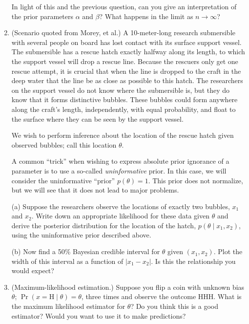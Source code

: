 \documentclass{article}
\newcommand{\given}{\mid}
\begin{document}
\begin{enumerate}
  In light of this and the previous question, can you give an
  interpretation of the prior parameters $\alpha$ and $\beta$?
  What happens in the limit as $n \to \infty$?

\item
  (Scenario quoted from Morey, et al.)  A 10-meter-long research
  submersible with several people on board has lost contact with its
  surface support vessel. The submersible has a rescue hatch exactly
  halfway along its length, to which the support vessel will drop a
  rescue line. Because the rescuers only get one rescue attempt, it is
  crucial that when the line is dropped to the craft in the deep water
  that the line be as close as possible to this hatch. The researchers
  on the support vessel do not know where the submersible is, but they
  do know that it forms distinctive bubbles. These bubbles could form
  anywhere along the craft's length, independently, with equal
  probability, and float to the surface where they can be seen by the
  support vessel.

  We wish to perform inference about the location of the rescue
  hatch given observed bubbles; call this location $\theta$.

  A common ``trick'' when wishing to express absolute prior ignorance
  of a parameter is to use a so-called \emph{uninformative} prior. In
  this case, we will consider the uninformative ``prior'' $p(\theta) =
  1$. This prior does not normalize, but we will see that it does not
  lead to major problems.

  (a) Suppose the researchers observe the locations of exactly two
  bubbles, $x_1$ and $x_2$. Write down an appropriate likelihood for
  these data given $\theta$ and derive the posterior distribution for
  the location of the hatch, $p(\theta \given x_1, x_2)$, using the
  uninformative prior described above.

  (b) Now find a 50\% Bayesian credible interval for $\theta$ given
  $(x_1, x_2)$. Plot the width of this interval as a function of
  $\lvert x_1 - x_2 \rvert$. Is this the relationship you would
  expect?

\item
  (Maximum-likelihood estimation.)  Suppose you flip a coin with
  unknown bias $\theta$; $\Pr(x = \text{H} \given \theta) = \theta$,
  three times and observe the outcome HHH.  What is the maximum
  likelihood estimator for $\theta$?  Do you think this is a good
  estimator?  Would you want to use it to make predictions?


\end{enumerate}
\end{document}
